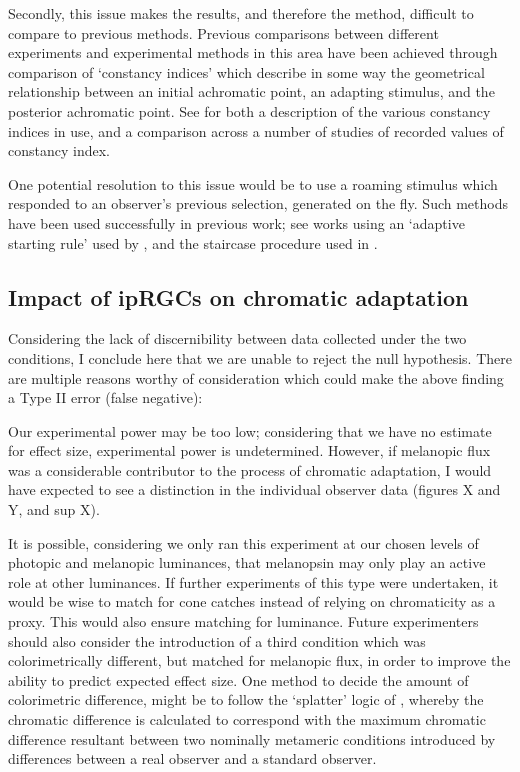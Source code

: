 Secondly, this issue makes the results, and therefore the method, difficult to compare to previous methods. Previous comparisons between different experiments and experimental methods in this area have been achieved through comparison of `constancy indices' which describe in some way the geometrical relationship between an initial achromatic point, an adapting stimulus, and the posterior achromatic point. See \citet{foster_color_2011} for both a description of the various constancy indices in use, and a comparison across a number of studies of recorded values of constancy index.

One potential resolution to this issue would be to use a roaming stimulus which responded to an observer's previous selection, generated on the fly. Such methods have been used successfully in previous work; see works using an `adaptive starting rule' used by \citet{delahunt_evaluation_2001}, and the staircase procedure used in \citet{lee_after-eects_2017}.

\subsection{Impact of ipRGCs on chromatic adaptation}

Considering the lack of discernibility between data collected under the two conditions, I conclude here that we are unable to reject the null hypothesis.
There are multiple reasons worthy of consideration which could make the above finding a Type II error (false negative): 

Our experimental power may be too low; considering that we have no estimate for effect size, experimental power is undetermined. However, if melanopic flux was a considerable contributor to the process of chromatic adaptation, I would have expected to see a distinction in the individual observer data (figures X and Y, and sup X).

It is possible, considering we only ran this experiment at our chosen levels of photopic and melanopic luminances, that melanopsin may only play an active role at other luminances. If further experiments of this type were undertaken, it would be wise to match for cone catches instead of relying on chromaticity as a proxy. This would also ensure matching for luminance.
Future experimenters should also consider the introduction of a third condition which was colorimetrically different, but matched for melanopic flux, in order to improve the ability to predict expected effect size. One method to decide the amount of colorimetric difference, might be to follow the `splatter' logic of \citet{spitschan_human_2016}, whereby the chromatic difference is calculated to correspond with the maximum chromatic difference resultant between two nominally metameric conditions introduced by differences between a real observer and a standard observer.

